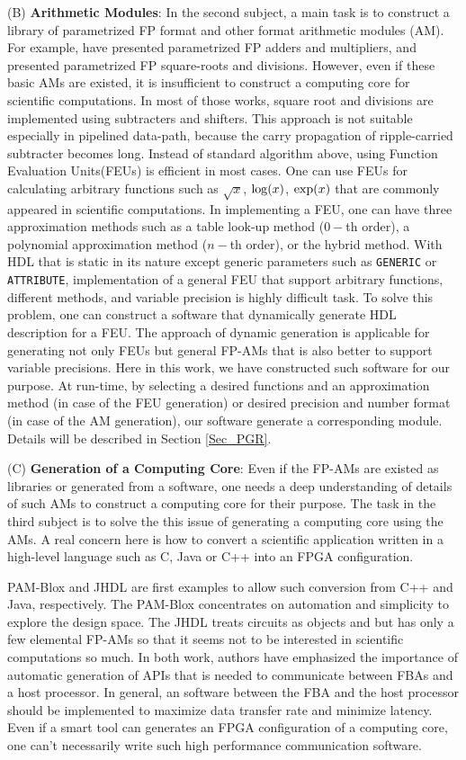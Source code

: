 \documentclass{llncs}
\begin{document}
(B) {\bf Arithmetic Modules}:
In the second subject, a main task is to construct a library
of parametrized FP format and other format arithmetic modules (AM). 
For example, \cite{JL01}\cite{LCCN03} have presented parametrized FP adders and
multipliers, and \cite{LKM02}\cite{WN04} presented parametrized FP square-roots and divisions. 
However, even if these basic AMs are existed, 
it is insufficient to construct a computing core for scientific computations.
In most of those works, square root and divisions are implemented
using subtracters and shifters. 
This approach is not suitable especially in pipelined data-path,
because the carry propagation of ripple-carried subtracter becomes long.
Instead of standard algorithm above, 
using Function Evaluation Units(FEUs) is efficient in most cases.
One can use FEUs for calculating arbitrary functions such as
$\sqrt{x}$, ${\rm log}(x)$, ${\rm exp}(x)$ that are commonly appeared in 
scientific computations.
In implementing a FEU, one can have three approximation methods such as
a table look-up method ($0-$th order), a polynomial approximation method ($n-$th order),
or the hybrid method\cite{FO01}\cite{M97}. 
With HDL that is static in its nature except generic parameters
such as \verb|GENERIC| or \verb|ATTRIBUTE|,
implementation of a general FEU that support arbitrary functions, 
different methods, and variable precision is highly difficult task.
To solve this problem, one can construct a software that dynamically generate 
HDL description for a FEU.
The approach of dynamic generation is applicable for generating
not only FEUs but general FP-AMs that is also
better to support variable precisions.
Here in this work, we have constructed such software for our purpose.
At run-time, by selecting a desired functions and an approximation method
(in case of the FEU generation) or desired precision and number format
(in case of the AM generation), our software generate a corresponding module.
Details will be described in Section \ref{Sec_PGR}.

(C) {\bf Generation of a Computing Core}:
Even if the FP-AMs are existed as libraries or generated
from a software, one needs a deep understanding of details of such AMs
to construct a computing core for their purpose.
The task in the third subject is to solve the this issue
of generating a computing core using the AMs.
A real concern here is how to convert a scientific application
written in a high-level language such as C, Java or C++ into an FPGA configuration.

PAM-Blox\cite{MMF97} and JHDL\cite{BH98} are first examples
to allow such conversion from C++ and Java, respectively.
The PAM-Blox concentrates on automation and simplicity to explore the design space.
The JHDL treats circuits as objects and but has only a few elemental FP-AMs
so that it seems not to be interested in scientific computations so much.  
In both work, authors have emphasized the importance of automatic
generation of APIs that is needed to communicate between FBAs and a host processor.
In general, an software between the FBA and the host processor
should be implemented to maximize data transfer rate and minimize latency.
Even if a smart tool can generates an FPGA configuration of a computing core,
one can't necessarily write such high performance communication software.
\end{document}
